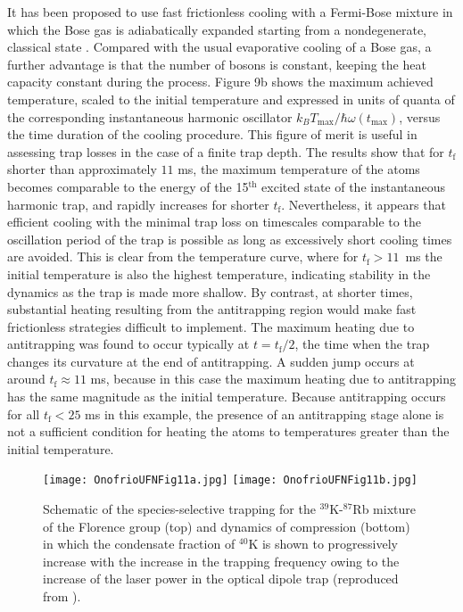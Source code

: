 \documentclass[pra,letterpaper,twocolumn,showpacs,superscriptaddress]{revtex4}
\begin{document}
It has been proposed to use fast frictionless cooling with a Fermi-Bose mixture in which the Bose 
gas is adiabatically expanded starting from a nondegenerate, classical state \cite{Choi2011}. 
Compared with the usual evaporative cooling of a Bose gas, a further advantage is that the 
number of bosons is constant, keeping the heat capacity constant during the process. 
Figure 9b shows the maximum achieved temperature, scaled to the initial temperature and 
expressed in units of quanta of the corresponding instantaneous harmonic oscillator 
$k_B T_\mathrm{max}/\hbar \omega(t_\mathrm{max})$, versus the time duration of the 
cooling procedure.  This figure of merit is useful in  assessing trap losses in the case 
of a finite trap depth. The results show that for $t_{\mathrm f}$ shorter than approximately 
$11$ ms, the maximum temperature of the atoms becomes comparable to the energy of the 
15${}^\mathrm{th}$ excited state of the instantaneous harmonic trap, and rapidly increases 
for shorter $t_{\mathrm f}$. Nevertheless, it appears that efficient cooling  with the minimal 
trap loss on timescales comparable to the oscillation period of the trap is possible as 
long as excessively short cooling times are avoided. This is clear from the temperature curve, 
where for $t_{\mathrm f} > 11$~ms the initial temperature is also the highest temperature, indicating
stability in the dynamics as the trap is made more shallow. By contrast, at shorter times,
substantial heating resulting from the antitrapping region would make fast frictionless
strategies difficult to implement. The maximum heating due to antitrapping was found to 
occur typically at  $t = t_{\mathrm f}/2$,  the time when the trap changes its curvature 
at the end of antitrapping. A sudden jump occurs at around  $t_{\mathrm f}  \approx 11$ ms, 
because in this case the maximum heating due to antitrapping has the same magnitude as the 
initial temperature.  Because antitrapping occurs for all $t_{\mathrm f}< 25$ ms in this example, the 
presence of an antitrapping stage alone is not a sufficient condition for heating the atoms to 
temperatures greater than the initial temperature.

\begin{figure}[t]
\begin{center}
\texttt{[image: OnofrioUFNFig11a.jpg]}
\texttt{[image: OnofrioUFNFig11b.jpg]}
\caption{Schematic of the species-selective trapping for the ${}^{39}$K-${}^{87}$Rb 
mixture of the Florence group (top) and dynamics of compression (bottom) in which the condensate 
fraction of ${}^{40}$K is shown to progressively increase with the increase in the trapping frequency 
owing to the increase of the laser power in the optical dipole trap (reproduced from \cite{Catani2009}).}
\label{}
\end{center}
\end{figure}
\end{document}
